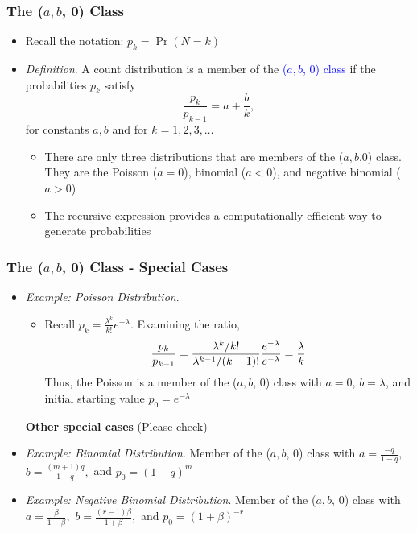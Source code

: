 \documentclass{beamer}
\begin{document}
\begin{frame}%
 \frametitle{The ($a, b$, 0) Class}
\begin{itemize}
   \item Recall the notation: $p_k= \Pr(N = k)$ \vspace{2mm}
 \item \textit{Definition}. A count distribution is a member of the \textcolor{blue}{($a, b$, 0) class} if the probabilities $p_k$ satisfy
\begin{equation*}
\frac{p_k}{p_{k-1}}=a+\frac{b}{k},
\end{equation*}
for constants $a,b$ and for $k=1,2,3, \ldots $ \vspace{2mm}
\begin{itemize}
\item There are only three distributions that are members of the ($a,b$,0) class. They are the Poisson ($a=0$), binomial ($a<0$), and negative binomial
($a>0$) \vspace{2mm}
\item The recursive expression provides a computationally efficient way to generate
probabilities
\end{itemize}
 \end{itemize}
\end{frame}

\begin{frame}%
 \frametitle{The ($a, b$, 0) Class - Special Cases}
\begin{itemize}
   \item \textit{Example: Poisson Distribution}.
   \begin{itemize}
   \item Recall $p_k =\frac{\lambda^k}{k!}e^{-\lambda}$. Examining the ratio,
\begin{equation*}
\frac{p_k}{p_{k-1}} =
\frac{\lambda^k/k!}{\lambda^{k-1}/(k-1)!}\frac{e^{-\lambda}}{e^{-\lambda}}=
\frac{\lambda}{k} \vspace{2mm}
\end{equation*}
Thus, the Poisson is a member of the ($a, b$, 0) class with $a = 0$,
$b = \lambda$, and initial starting value $p_0 = e^{-\lambda}$
\vspace{2mm}
\end{itemize}

\textbf{Other special cases} (Please check)

\item \textit{Example: Binomial Distribution}. Member of the ($a, b$, 0) class with $a = \frac{-q}{1-q},$ $b = \frac{(m+1)q}{1-q},$ and $p_0 =
(1-q)^m$ \vspace{2mm}

\item \textit{Example: Negative Binomial Distribution}. Member of the ($a, b$, 0) class with $a = \frac{\beta}{1+\beta},$ $b = \frac{(r-1)\beta}{1+\beta},$ and $p_0 = (1+\beta)^{-r}$
\end{itemize}
\end{frame}
\end{document}
